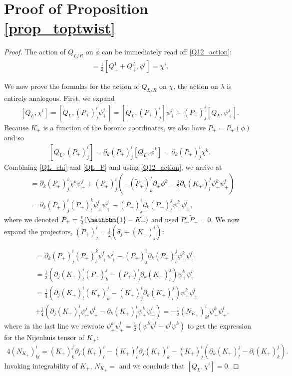\documentclass{article}
\newcommand{\id}{\mathbbm{1}}
\newcommand{\p}{\partial}
\def\tl{\tilde}
\theoremstyle{definition}
\theoremstyle{remark}
\begin{document}
\appendix
\section{Proof of Proposition \ref{prop_toptwist}}\label{appendix:proof_prop}
\begin{proof}
The action of $Q_{L/R}$ on $\phi$ can be immediately read off \eqref{Q12_action}:
\begin{align}
[Q_L,\phi^i]=\frac{1}{2}[Q_+^1+Q^2_+,\phi^i]=\chi^i.
\end{align}

We now prove the formulas for the action of $Q_{L/R}$ on $\chi$, the action on $\lambda$ is entirely analogous. First, we expand
\begin{align}\label{QL_chi}
[Q_L,\chi^i]=[Q_L,(P_+)^i_j\psi_+^j]=[Q_L,(P_+)^i_j]\psi_+^j{+}(P_+)^i_j[Q_L,\psi_+^j].
\end{align}
Because $K_+$ is a function of the bosonic coordinates, we also have $P_+=P_+(\phi)$ and so
\begin{align}\label{QL_P}
[Q_L,(P_+)^i_j]=\p_k(P_+)^i_j[Q_L,\phi^k]=\p_k(P_+)^i_j\chi^k.
\end{align}
Combining \eqref{QL_chi} and \eqref{QL_P} and using \eqref{Q12_action}, we arrive at
\begin{align*}
[Q_L,\chi^i]&=\p_k(P_+)^i_j\chi^k\psi_+^j{+}(P_+)^i_j\left(-(\tl{P}_+)^j_k\p_+\phi^k{-}\frac{1}{2}\p_k(K_+)^j_l\psi_+^k\psi_+^l\right)\\
&=\p_k(P_+)^i_j(P_+)^k_l\psi_+^l\psi_+^j{-}(P_+)^i_j\p_k(P_+)^j_l\psi_+^k\psi_+^l,
\end{align*}
where we denoted $\tl{P}_+=\frac{1}{2}(\id-K_+)$ and used $P_+\tl{P}_+=0$. We now expand the projectors, $(P_+)^i_j=\frac{1}{2}(\delta^i_j+(K_+)^i_j)$:

\begin{align*}
[Q_L,\chi^i]&=\p_k(P_+)^i_j(P_+)^k_l\psi_+^l\psi_+^j{-}(P_+)^i_j\p_k(P_+)^j_l\psi_+^k\psi_+^l\\
&=\frac{1}{2}(\p_j(K_+)^i_l(P_+)^j_k{-}(P_+)^i_j\p_k(K_+)^j_l)\psi_+^k\psi_+^l\\
&=\frac{1}{4}(\p_j(K_+)^i_l(K_+)^j_k{-}(K_+)^i_j\p_k(K_+)^j_l)\psi_+^k\psi_+^l\\
&+\frac{1}{4}(\p_j(K_+)^i_l\psi_+^j\psi_+^l{-}\p_k(K_+)^i_l\psi_+^k\psi_+^l)=-\frac{1}{2}(N_{K_+})^i_{kl}\psi_+^k\psi^l_+,
\end{align*}
where in the last line we rewrote $\psi_+^k\psi^l_+=\frac{1}{2}(\psi^k\psi^l-\psi^l\psi^k)$ to get the expression for the Nijenhuis tensor of $K_+$:
\begin{align*}
4(N_{K_+})^i_{kl}=(K_+)^j_k\p_j(K_+)^i_l-(K_+)^j_l\p_j(K_+)^i_k {-} (K_+)^i_j(\p_k(K_+)^j_l-\p_l(K_+)^j_k).
\end{align*}
Invoking integrability of $K_+$, $N_{K_+}=$ and we conclude that $[Q_L,\chi^i]=0$.


\end{proof}
\end{document}
